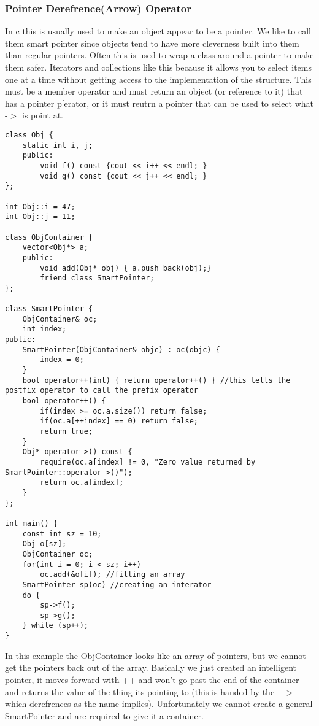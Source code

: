 \documentclass[12pt]{article}
\begin{document}
\subsubsection*{Pointer Derefrence(Arrow) Operator}
In c this is usually used to make an object appear to be a pointer. We like to call them smart pointer since objects tend to have more cleverness built into them than regular pointers. Often this is used to wrap a class around a pointer to make them safer. Iterators and collections like this because it allows you to select items one at a time without getting access to the implementation of the structure. This must be a member operator and must return an object (or reference to it) that has a pointer p[erator, or it must reutrn a pointer that can be used to select what -$>$ is point at.
\begin{lstlisting}
class Obj {
    static int i, j;
    public:
        void f() const {cout << i++ << endl; }
        void g() const {cout << j++ << endl; }
};

int Obj::i = 47;
int Obj::j = 11;

class ObjContainer {
    vector<Obj*> a;
    public:
        void add(Obj* obj) { a.push_back(obj);}
        friend class SmartPointer;
};

class SmartPointer {
    ObjContainer& oc;
    int index;
public:
    SmartPointer(ObjContainer& objc) : oc(objc) {
        index = 0;
    }
    bool operator++(int) { return operator++() } //this tells the postfix operator to call the prefix operator
    bool operator++() {
        if(index >= oc.a.size()) return false;
        if(oc.a[++index] == 0) return false;
        return true;
    }
    Obj* operator->() const {
        require(oc.a[index] != 0, "Zero value returned by SmartPointer::operator->()");
        return oc.a[index];
    }
};

int main() {
    const int sz = 10;
    Obj o[sz];
    ObjContainer oc;
    for(int i = 0; i < sz; i++)
        oc.add(&o[i]); //filling an array
    SmartPointer sp(oc) //creating an interator
    do {
        sp->f();
        sp->g();
    } while (sp++);
}
\end{lstlisting}

In this example the ObjContainer looks like an array of pointers, but we cannot get the pointers back out of the array. Basically we just created an intelligent pointer, it moves forward with ++ and won't go past the end of the container and returns the value of the thing its pointing to (this is handed by the $->$ which derefrences as the name implies). Unfortunately we cannot create a general SmartPointer and are required to give it a container.
\end{document}
